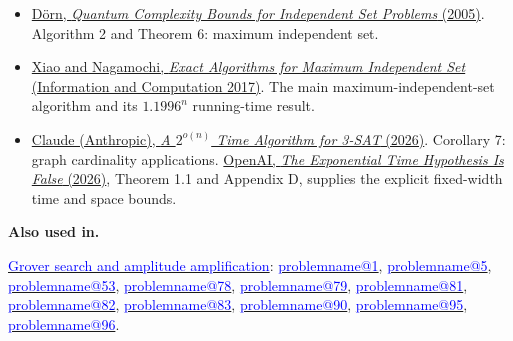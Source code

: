 \documentclass[11pt,a4paper]{article}
\makeatletter
\theoremstyle{problemstyle}
\newcommand{\subhead}[1]{\Needspace{4\baselineskip}\par\vspace{5pt}{\bfseries #1\par}\vspace{1pt}}
\newenvironment{algorithmindex}[1]{%
  \begin{itemize}[label=\textbullet,leftmargin=1.3em,labelsep=0.6em,itemsep=4pt,topsep=3pt,parsep=0pt]
  \small
}{\end{itemize}}
\newcommand{\problemref}[1]{\hyperref[entry:#1]{\textcolor{blue}{\csname problemname@#1\endcsname}}}
\newcommand{\algorithmref}[2]{\hyperref[algorithm:#1]{\textcolor{blue}{#2}}}
\makeatother
\begin{document}
\subhead{Algorithm: D\"orn\textquotesingle s amplified branching algorithm}
\begin{algorithmindex}{20}
\item \href{https://arxiv.org/pdf/quant-ph/0510084}{D\"orn, \emph{Quantum Complexity Bounds for Independent Set Problems} (2005)}. Algorithm 2 and Theorem 6: maximum independent set.
\item \href{https://arxiv.org/pdf/1312.6260}{Xiao and Nagamochi, \emph{Exact Algorithms for Maximum Independent Set} (Information and Computation 2017)}. The main maximum-independent-set algorithm and its $1.1996^n$ running-time result.
\item \href{https://github.com/anthropics/formal-math/tree/main/eth}{Claude (Anthropic), \emph{A $2^{o(n)}$ Time Algorithm for 3-SAT} (2026)}. Corollary 7: graph cardinality applications. \href{https://github.com/openai/math/blob/main/preprints/The-Exponential-Time-Hypothesis-is-False-October-25-2026/paper.pdf}{OpenAI, \emph{The Exponential Time Hypothesis Is False} (2026)}, Theorem 1.1 and Appendix D, supplies the explicit fixed-width time and space bounds.
\end{algorithmindex}
\par{}\begingroup\small
\textbf{Also used in.}
\par\algorithmref{grover}{Grover search and amplitude amplification}: \problemref{1}, \problemref{5}, \problemref{53}, \problemref{78}, \problemref{79}, \problemref{81}, \problemref{82}, \problemref{83}, \problemref{90}, \problemref{95}, \problemref{96}.
\par\endgroup
\end{document}
